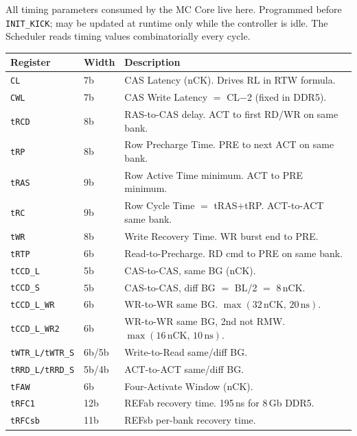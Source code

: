 \documentclass[10pt,a4paper]{article}
\newcommand{\Th}[1]{\cellcolor{thbg}\textbf{\small\color{acc1}#1}}
\newcommand{\RA}{\rowcolor{white}}
\newcommand{\RB}{\rowcolor{altbg}}
\begin{document}
All timing parameters consumed by the MC Core live here. Programmed before
\texttt{INIT\_KICK}; may be updated at runtime only while the controller is idle.
The Scheduler reads timing values combinatorially every cycle.

\begin{center}
\begin{tabularx}{\linewidth}{@{} l l X @{}}
\toprule
\Th{Register} & \Th{Width} & \Th{Description} \\
\midrule
\RA \texttt{CL}              & 7b  & CAS Latency (nCK). Drives RL in RTW formula. \\
\RB \texttt{CWL}             & 7b  & CAS Write Latency $=$ CL$-$2 (fixed in DDR5). \\
\RA \texttt{tRCD}            & 8b  & RAS-to-CAS delay. ACT to first RD/WR on same bank. \\
\RB \texttt{tRP}             & 8b  & Row Precharge Time. PRE to next ACT on same bank. \\
\RA \texttt{tRAS}            & 9b  & Row Active Time minimum. ACT to PRE minimum. \\
\RB \texttt{tRC}             & 9b  & Row Cycle Time $=$ tRAS$+$tRP. ACT-to-ACT same bank. \\
\RA \texttt{tWR}             & 8b  & Write Recovery Time. WR burst end to PRE. \\
\RB \texttt{tRTP}            & 6b  & Read-to-Precharge. RD cmd to PRE on same bank. \\
\RA \texttt{tCCD\_L}         & 5b  & CAS-to-CAS, same BG (nCK). \\
\RB \texttt{tCCD\_S}         & 5b  & CAS-to-CAS, diff BG $=$ BL/2 $=$ 8\,nCK. \\
\RA \texttt{tCCD\_L\_WR}     & 6b  & WR-to-WR same BG. $\max(32\,\text{nCK},\,20\,\text{ns})$. \\
\RB \texttt{tCCD\_L\_WR2}    & 6b  & WR-to-WR same BG, 2nd not RMW. $\max(16\,\text{nCK},\,10\,\text{ns})$. \\
\RA \texttt{tWTR\_L/tWTR\_S} & 6b/5b & Write-to-Read same/diff BG. \\
\RB \texttt{tRRD\_L/tRRD\_S} & 5b/4b & ACT-to-ACT same/diff BG. \\
\RA \texttt{tFAW}            & 6b  & Four-Activate Window (nCK). \\
\RB \texttt{tRFC1}           & 12b & REFab recovery time. 195\,ns for 8\,Gb DDR5. \\
\RA \texttt{tRFCsb}          & 11b & REFsb per-bank recovery time. \\

\end{tabularx}
\end{center}
\end{document}
